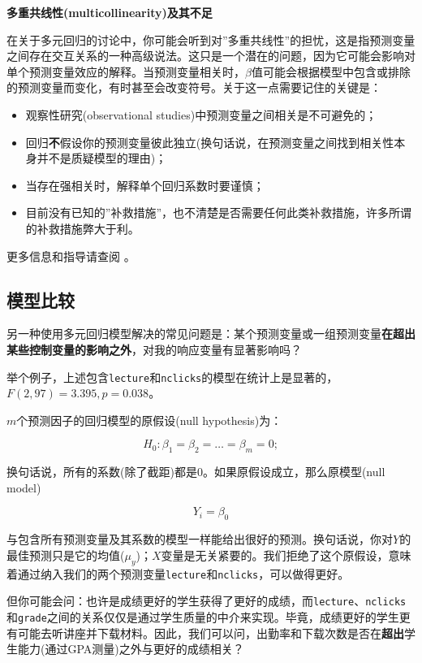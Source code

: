 \documentclass[
]{book}
\providecommand{\tightlist}{%
  \setlength{\itemsep}{0pt}\setlength{\parskip}{0pt}}
\begin{document}
\textbf{多重共线性(multicollinearity)及其不足}

在关于多元回归的讨论中，你可能会听到对''多重共线性''的担忧，这是指预测变量之间存在交互关系的一种高级说法。这只是一个潜在的问题，因为它可能会影响对单个预测变量效应的解释。当预测变量相关时，\(\beta\)值可能会根据模型中包含或排除的预测变量而变化，有时甚至会改变符号。关于这一点需要记住的关键是：

\begin{itemize}
\tightlist
\item
  观察性研究(observational studies)中预测变量之间相关是不可避免的；
\item
  回归\textbf{不}假设你的预测变量彼此独立(换句话说，在预测变量之间找到相关性本身并不是质疑模型的理由)；
\item
  当存在强相关时，解释单个回归系数时要谨慎；
\item
  目前没有已知的''补救措施''，也不清楚是否需要任何此类补救措施，许多所谓的补救措施弊大于利。
\end{itemize}

更多信息和指导请查阅 \citet{Vanhove_2021} 。

\hypertarget{ux6a21ux578bux6bd4ux8f83}{%
\subsection{模型比较}\label{ux6a21ux578bux6bd4ux8f83}}

另一种使用多元回归模型解决的常见问题是：某个预测变量或一组预测变量\textbf{在超出某些控制变量的影响之外}，对我的响应变量有显著影响吗？

举个例子，上述包含\texttt{lecture}和\texttt{nclicks}的模型在统计上是显著的， \(F(2,97) = 3.395, p =0.038\)。

\(m\)个预测因子的回归模型的原假设(null hypothesis)为：

\[H_0: \beta_1 = \beta_2 = \ldots = \beta_m = 0;\]

换句话说，所有的系数(除了截距)都是0。如果原假设成立，那么原模型(null model)

\[Y_i = \beta_0\]

与包含所有预测变量及其系数的模型一样能给出很好的预测。换句话说，你对\(Y\)的最佳预测只是它的均值(\(\mu_y\))；\(X\)变量是无关紧要的。我们拒绝了这个原假设，意味着通过纳入我们的两个预测变量\texttt{lecture}和\texttt{nclicks}，可以做得更好。

但你可能会问：也许是成绩更好的学生获得了更好的成绩，而\texttt{lecture}、\texttt{nclicks}和\texttt{grade}之间的关系仅仅是通过学生质量的中介来实现。毕竟，成绩更好的学生更有可能去听讲座并下载材料。因此，我们可以问，出勤率和下载次数是否在\textbf{超出}学生能力(通过GPA测量)之外与更好的成绩相关？
\end{document}
